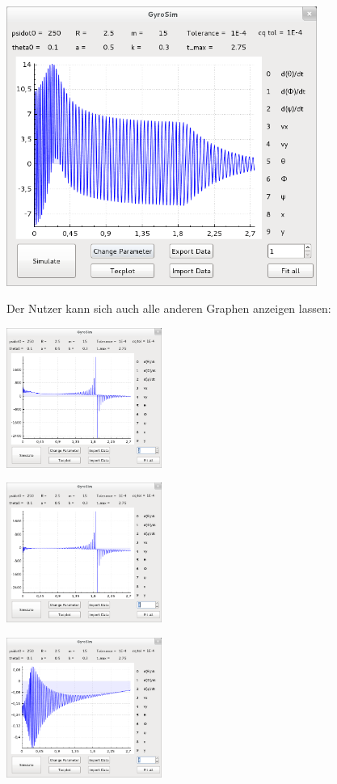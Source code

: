 \includegraphics[width=4in,keepaspectratio=true]{figures/mainwindow_after_sim_klicked.png}
\newpage

Der Nutzer kann sich auch alle anderen Graphen anzeigen lassen:

\includegraphics[width=2in,keepaspectratio=true]{figures/mainwindow_g2.png}

\includegraphics[width=2in,keepaspectratio=true]{figures/mainwindow_g3.png}

\includegraphics[width=2in,keepaspectratio=true]{figures/mainwindow_g4.png}

